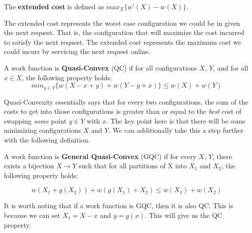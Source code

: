 \begin{definition}
    The \textbf{extended cost} is defined as $max_X \{ w'(X) - w(X)\}$.
\end{definition}

The extended cost represents the worst case configuration we could be in given the next request. That is, the configuration that will maximize the cost incurred to satisfy the next request. The extended cost represents the maximum cost we could incurr by servicing the next request online.

\begin{definition}
    A work function is \textbf{Quasi-Convex} (QC) if for all configurations $X$, $Y$, and for all $x \in X$, the following property holds:
    \begin{equation*}
        min_{y \in Y} \{ w(X - x + y) + w(Y - y + x)\} \leq w(X) + w(Y)
    \end{equation*}
\end{definition}

Quasi-Convexity essentially says that for every two configurations, the sum of the costs to get into those configurations is greater than or equal to the \textit{best} cost of swapping \textit{some} point $y\in Y$ with $x$. The key point here is that there will be some minimizing configurations $X$ and $Y$. We can additionally take this a step further with the following definition.

\begin{definition}
A work function is \textbf{General Quasi-Convex} (GQC) if for every $X$, $Y$, there exists a bijection $X \rightarrow Y$ such that for all partitions of X into $X_1$ and $X_2$, the following property holds:

\begin{equation*}
    w(X_1 + g(X_2)) + w(g(X_1) + X_2) \leq w(X_1) + w(X_2)
\end{equation*}
\end{definition}

It is worth noting that if a work function is GQC, then it is also QC. This is because we can set $X_1 = X-x$ and $y = g(x)$. This will give us the QC property.

